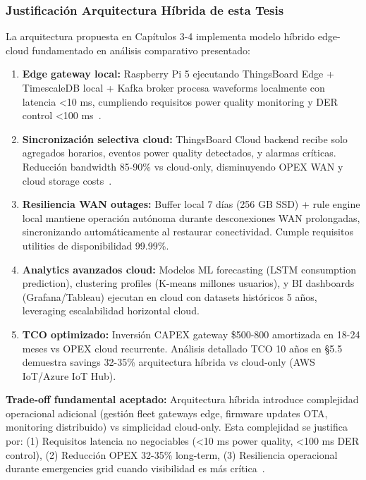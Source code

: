 \subsubsection{Justificación Arquitectura Híbrida de esta Tesis}

La arquitectura propuesta en Capítulos 3-4 implementa modelo híbrido edge-cloud fundamentado en análisis comparativo presentado:

\begin{enumerate}
\item \textbf{Edge gateway local:} Raspberry Pi 5 ejecutando ThingsBoard Edge + TimescaleDB local + Kafka broker procesa waveforms localmente con latencia <10 ms, cumpliendo requisitos power quality monitoring y DER control <100 ms~\cite{andriuloEdgeComputingCloud2024,minhEdgeComputingIoTEnabled2022}.

\item \textbf{Sincronización selectiva cloud:} ThingsBoard Cloud backend recibe solo agregados horarios, eventos power quality detectados, y alarmas críticas. Reducción bandwidth 85-90\% vs cloud-only, disminuyendo OPEX WAN y cloud storage costs~\cite{andriuloEdgeComputingCloud2024}.

\item \textbf{Resiliencia WAN outages:} Buffer local 7 días (256 GB SSD) + rule engine local mantiene operación autónoma durante desconexiones WAN prolongadas, sincronizando automáticamente al restaurar conectividad. Cumple requisitos utilities de disponibilidad 99.99\%.

\item \textbf{Analytics avanzados cloud:} Modelos ML forecasting (LSTM consumption prediction), clustering profiles (K-means millones usuarios), y BI dashboards (Grafana/Tableau) ejecutan en cloud con datasets históricos 5 años, leveraging escalabilidad horizontal cloud.

\item \textbf{TCO optimizado:} Inversión CAPEX gateway \$500-800 amortizada en 18-24 meses vs OPEX cloud recurrente. Análisis detallado TCO 10 años en §5.5 demuestra savings 32-35\% arquitectura híbrida vs cloud-only (AWS IoT/Azure IoT Hub).
\end{enumerate}

\textbf{Trade-off fundamental aceptado:} Arquitectura híbrida introduce complejidad operacional adicional (gestión fleet gateways edge, firmware updates OTA, monitoring distribuido) vs simplicidad cloud-only. Esta complejidad se justifica por: (1) Requisitos latencia no negociables (<10 ms power quality, <100 ms DER control), (2) Reducción OPEX 32-35\% long-term, (3) Resiliencia operacional durante emergencies grid cuando visibilidad es más crítica~\cite{andriuloEdgeComputingCloud2024,minhEdgeComputingIoTEnabled2022}.

